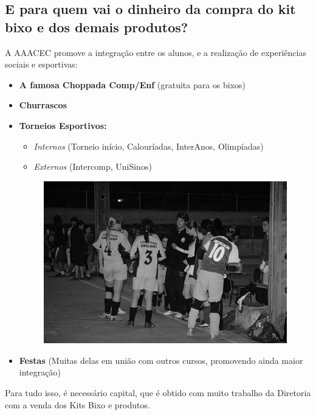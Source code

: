 \subsection{E para quem vai o dinheiro da compra do kit bixo e dos demais produtos?}

A AAACEC promove a integração entre os alunos, e a realização de experiências
sociais e esportivas:

\begin{itemize}
\item  \textbf{A famosa Choppada Comp/Enf} (gratuita para os bixos)
\item  \textbf{Churrascos}
\item  \textbf{Torneios Esportivos:}
\begin{itemize}
\item  \textit{Internos} (Torneio início, Calouríadas, InterAnos, Olimpíadas)
\item  \textit{Externos} (Intercomp, UniSinos)
\end{itemize}
\begin{figure}[h!]
    \vspace{-10pt}
    \centering
    \includegraphics[scale=0.58, keepaspectratio=true]{img/imgs/20-aaacec/-100.jpg}
    \vspace{-10pt}
\end{figure}
\item  \textbf{Festas} (Muitas delas em união com outros cursos, promovendo ainda maior integração)
\end{itemize}

Para tudo isso, é necessário capital, que é obtido com muito trabalho da
Diretoria com a venda dos Kits Bixo e produtos.

